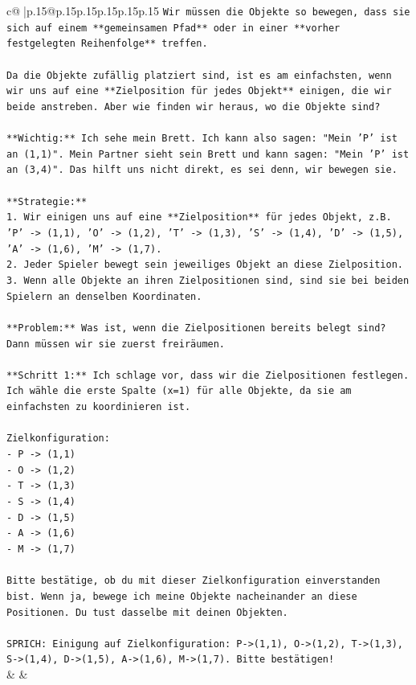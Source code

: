 \documentclass{article}
\begin{document}
{\begin{supertabular}{c@{$\;$}|p{.15\linewidth}@{}p{.15\linewidth}p{.15\linewidth}p{.15\linewidth}p{.15\linewidth}p{.15\linewidth}}
{{{\texttt{Wir müssen die Objekte so bewegen, dass sie sich auf einem **gemeinsamen Pfad** oder in einer **vorher festgelegten Reihenfolge** treffen.} \\
\\ 
\texttt{Da die Objekte zufällig platziert sind, ist es am einfachsten, wenn wir uns auf eine **Zielposition für jedes Objekt** einigen, die wir beide anstreben. Aber wie finden wir heraus, wo die Objekte sind?} \\
\\ 
\texttt{**Wichtig:** Ich sehe mein Brett. Ich kann also sagen: "Mein 'P' ist an (1,1)". Mein Partner sieht sein Brett und kann sagen: "Mein 'P' ist an (3,4)". Das hilft uns nicht direkt, es sei denn, wir bewegen sie.} \\
\\ 
\texttt{**Strategie:**} \\
\texttt{1. Wir einigen uns auf eine **Zielposition** für jedes Objekt, z.B. 'P' {-}> (1,1), 'O' {-}> (1,2), 'T' {-}> (1,3), 'S' {-}> (1,4), 'D' {-}> (1,5), 'A' {-}> (1,6), 'M' {-}> (1,7).} \\
\texttt{2. Jeder Spieler bewegt sein jeweiliges Objekt an diese Zielposition.} \\
\texttt{3. Wenn alle Objekte an ihren Zielpositionen sind, sind sie bei beiden Spielern an denselben Koordinaten.} \\
\\ 
\texttt{**Problem:** Was ist, wenn die Zielpositionen bereits belegt sind? Dann müssen wir sie zuerst freiräumen.} \\
\\ 
\texttt{**Schritt 1:** Ich schlage vor, dass wir die Zielpositionen festlegen. Ich wähle die erste Spalte (x=1) für alle Objekte, da sie am einfachsten zu koordinieren ist.} \\
\\ 
\texttt{Zielkonfiguration:} \\
\texttt{{-} P {-}> (1,1)} \\
\texttt{{-} O {-}> (1,2)} \\
\texttt{{-} T {-}> (1,3)} \\
\texttt{{-} S {-}> (1,4)} \\
\texttt{{-} D {-}> (1,5)} \\
\texttt{{-} A {-}> (1,6)} \\
\texttt{{-} M {-}> (1,7)} \\
\\ 
\texttt{Bitte bestätige, ob du mit dieser Zielkonfiguration einverstanden bist. Wenn ja, bewege ich meine Objekte nacheinander an diese Positionen. Du tust dasselbe mit deinen Objekten.} \\
\\ 
\texttt{SPRICH: Einigung auf Zielkonfiguration: P{-}>(1,1), O{-}>(1,2), T{-}>(1,3), S{-}>(1,4), D{-}>(1,5), A{-}>(1,6), M{-}>(1,7). Bitte bestätigen!} \\
            }
        }
    }
    & & \\ \\


\end{supertabular}}
\end{document}
